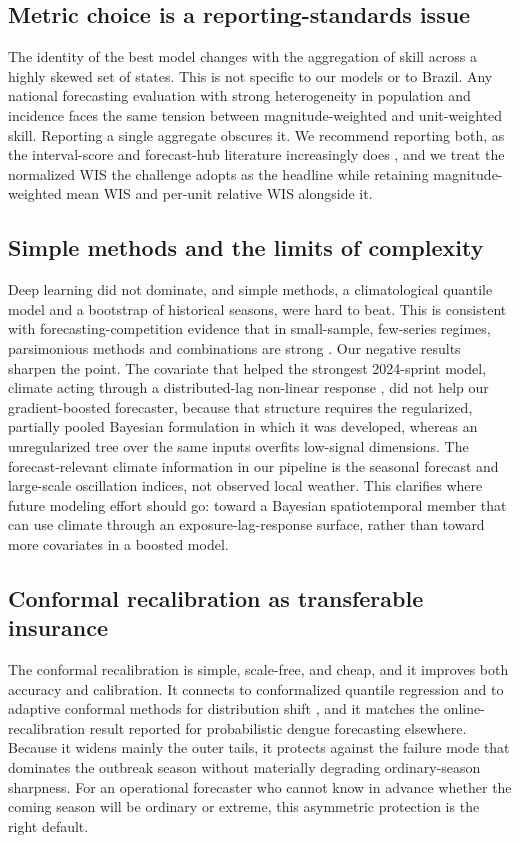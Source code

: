 \documentclass[11pt]{article}
\begin{document}
\subsection{Metric choice is a reporting-standards issue}
The identity of the best model changes with the aggregation of skill across a highly skewed set of
states. This is not specific to our models or to Brazil. Any national forecasting evaluation with
strong heterogeneity in population and incidence faces the same tension between magnitude-weighted
and unit-weighted skill. Reporting a single aggregate obscures it. We recommend reporting both, as
the interval-score and forecast-hub literature increasingly does \citep{bracher2021}, and we treat
the normalized WIS the challenge adopts as the headline while retaining magnitude-weighted mean WIS
and per-unit relative WIS alongside it.

\subsection{Simple methods and the limits of complexity}
Deep learning did not dominate, and simple methods, a climatological quantile model and a bootstrap
of historical seasons, were hard to beat. This is consistent with forecasting-competition evidence
that in small-sample, few-series regimes, parsimonious methods and combinations are strong
\citep{makridakis2020}. Our negative results sharpen the point. The covariate that helped the
strongest 2024-sprint model, climate acting through a distributed-lag non-linear response
\citep{lowe2021,gasparrini2010}, did not help our gradient-boosted forecaster, because that
structure requires the regularized, partially pooled Bayesian formulation in which it was developed,
whereas an unregularized tree over the same inputs overfits low-signal dimensions. The forecast-relevant
climate information in our pipeline is the seasonal forecast and large-scale oscillation indices, not
observed local weather. This clarifies where future modeling effort should go: toward a Bayesian
spatiotemporal member that can use climate through an exposure-lag-response surface, rather than
toward more covariates in a boosted model.

\subsection{Conformal recalibration as transferable insurance}
The conformal recalibration is simple, scale-free, and cheap, and it improves both accuracy and
calibration. It connects to conformalized quantile regression \citep{romano2019} and to adaptive
conformal methods for distribution shift \citep{gibbs2021}, and it matches the online-recalibration
result reported for probabilistic dengue forecasting elsewhere. Because it widens mainly the outer
tails, it protects against the failure mode that dominates the outbreak season without materially
degrading ordinary-season sharpness. For an operational forecaster who cannot know in advance whether
the coming season will be ordinary or extreme, this asymmetric protection is the right default.
\end{document}
